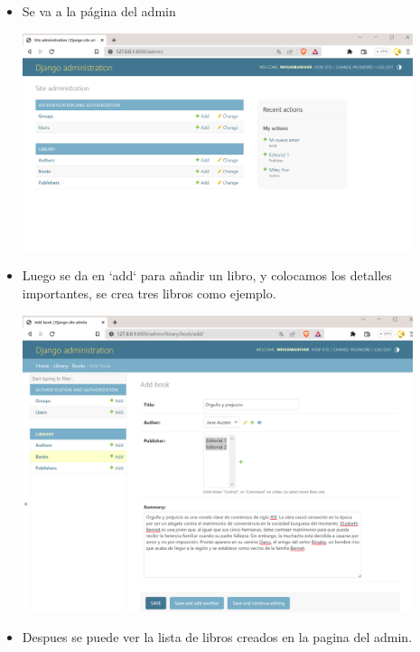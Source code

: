 \documentclass{article}
\begin{document}
\begin{itemize}

\item Se va a la página del admin

\begin{minipage}{\linewidth}
    \centering
    \includegraphics[width=0.90\textwidth]{imagenes/img2.png}
\end{minipage}
\vspace{\baselineskip}

\item Luego se da en `add` para añadir un libro, y colocamos los detalles importantes, se crea tres libros como ejemplo.

\begin{minipage}{\linewidth}
    \centering
    \includegraphics[width=0.90\textwidth]{imagenes/img3.png}
\end{minipage}
\vspace{\baselineskip}

\item Despues se puede ver la lista de libros creados en la pagina del admin.


\end{itemize}
\end{document}
